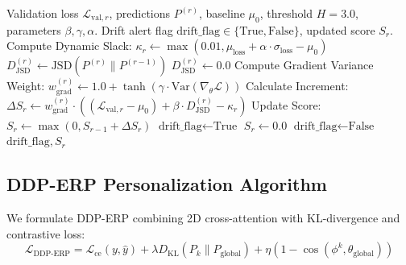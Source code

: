 \documentclass[11pt,a4paper]{article}
\begin{document}
\begin{algorithm}[htbp]
\caption{Proposed AD-CUSUM Drift Detection Algorithm (Project Invention)}
\label{alg:ad_cusum_springer}
\begin{algorithmic}[1]
\REQUIRE Validation loss $\mathcal{L}_{\text{val}, r}$, predictions $P^{(r)}$, baseline $\mu_0$, threshold $H = 3.0$, parameters $\beta, \gamma, \alpha$.
\ENSURE Drift alert flag $\text{drift\_flag} \in \{\text{True}, \text{False}\}$, updated score $S_r$.
\STATE Compute Dynamic Slack: $\kappa_r \leftarrow \max(0.01, \mu_{\text{loss}} + \alpha \cdot \sigma_{\text{loss}} - \mu_0)$
    \STATE $D_{\text{JSD}}^{(r)} \leftarrow \text{JSD}\left(P^{(r)} \parallel P^{(r-1)}\right)$
\ELSE
    \STATE $D_{\text{JSD}}^{(r)} \leftarrow 0.0$
\ENDIF
\STATE Compute Gradient Variance Weight: $w_{\text{grad}}^{(r)} \leftarrow 1.0 + \tanh\left(\gamma \cdot \text{Var}(\nabla_\theta \mathcal{L})\right)$
\STATE Calculate Increment: $\Delta S_r \leftarrow w_{\text{grad}}^{(r)} \cdot \left((\mathcal{L}_{\text{val}, r} - \mu_0) + \beta \cdot D_{\text{JSD}}^{(r)} - \kappa_r\right)$
\STATE Update Score: $S_r \leftarrow \max(0, S_{r-1} + \Delta S_r)$
    \STATE $\text{drift\_flag} \leftarrow \text{True}$ 
    \STATE $S_r \leftarrow 0.0$ 
\ELSE
    \STATE $\text{drift\_flag} \leftarrow \text{False}$
\ENDIF
\RETURN $\text{drift\_flag}, S_r$
\end{algorithmic}
\end{algorithm}

\subsection{DDP-ERP Personalization Algorithm}
We formulate DDP-ERP combining 2D cross-attention with KL-divergence and contrastive loss:
$$\mathcal{L}_{\text{DDP-ERP}} = \mathcal{L}_{\text{ce}}(y, \hat{y}) + \lambda D_{\text{KL}}\left(P_k \parallel P_{\text{global}}\right) + \eta (1 - \cos(\phi^k, \theta_{\text{global}}))$$
\end{document}
